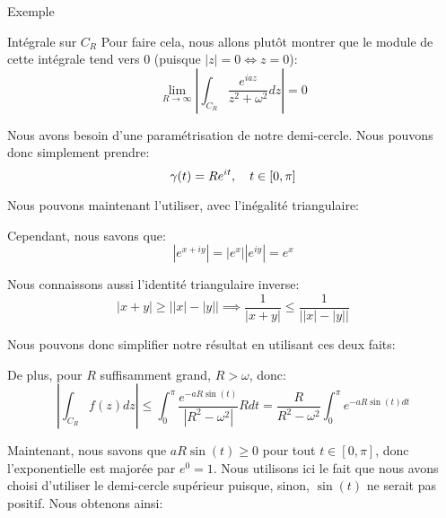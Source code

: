 \documentclass[a4paper]{article}
\begin{document}
\begin{parag}{Exemple}
\begin{subparag}{Intégrale sur $C_R$}
        Pour faire cela, nous allons plutôt montrer que le module de cette intégrale tend vers 0 (puisque $\left|z\right| = 0 \iff z = 0$):
        \[\lim_{R \to \infty} \left|\int_{C_R} \frac{e^{i a z}}{z^2 + \omega^2} dz\right| = 0\]

        Nous avons besoin d'une paramétrisation de notre demi-cercle. Nous pouvons donc simplement prendre: 
        \[\gamma\left(t\right) = R e^{it}, \mathspace t \in \left[0, \pi\right]\]

        Nous pouvons maintenant l'utiliser, avec l'inégalité triangulaire: 

        Cependant, nous savons que: 
        \[\left|e^{x + iy}\right| = \left|e^x\right|\left|e^{iy}\right| = e^x\]

        Nous connaissons aussi l'identité triangulaire inverse: 
        \[\left|x + y\right| \geq \left|\left|x\right| - \left|y\right|\right| \implies \frac{1}{\left|x+y\right|} \leq \frac{1}{\left|\left|x\right| - \left|y\right|\right|}\]

        Nous pouvons donc simplifier notre résultat en utilisant ces deux faits:

        De plus, pour $R$ suffisamment grand, $R > \omega$, donc: 
        \[\left|\int_{C_R} f\left(z\right) dz\right| \leq \int_{0}^{\pi} \frac{e^{-a R \sin\left(t\right)}}{\left|R^2 - \omega^2\right|} R dt = \frac{R}{R^2 - \omega^2} \int_{0}^{\pi} e^{-a R \sin\left(t\right) dt}\]
        
        Maintenant, nous savons que $aR\sin\left(t\right) \geq 0$ pour tout $t \in \left[0, \pi\right]$, donc l'exponentielle est majorée par $e^0 = 1$. Nous utilisons ici le fait que nous avons choisi d'utiliser le demi-cercle supérieur puisque, sinon, $\sin\left(t\right)$ ne serait pas positif. Nous obtenons ainsi:
        

\end{subparag}
\end{parag}
\end{document}
